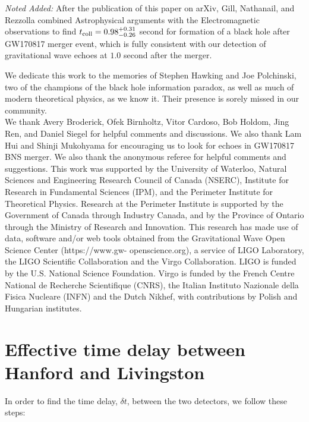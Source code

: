 \documentclass[a4paper,11pt]{article}
\begin{document}
{\it Noted Added:} After the publication of this paper on arXiv, Gill, Nathanail, and Rezzolla \cite{Gill:2019bvq} combined Astrophysical arguments with the Electromagnetic observations to find $t_{\rm coll}=0.98^{+0.31}_{-0.26}$ second for formation of a black hole after GW170817 merger event, which is fully consistent with our detection of gravitational wave echoes at $1.0$ second after the merger. 

\acknowledgments
We dedicate this work to the memories of Stephen Hawking and Joe Polchinski, two of the champions of the black hole information paradox, as well as much of  modern theoretical physics, as we know it. Their presence is sorely missed in our community. 
\\

We thank Avery Broderick,  Ofek Birnholtz, Vitor Cardoso, Bob Holdom, Jing Ren, and Daniel Siegel for helpful comments and discussions. We also thank Lam Hui and Shinji Mukohyama for encouraging us to look for echoes in GW170817 BNS merger. We also thank the anonymous referee for helpful comments and suggestions. This work was supported by the University of Waterloo, Natural Sciences and Engineering Research Council of Canada (NSERC), Institute for Research in Fundamental Sciences (IPM), and the Perimeter Institute for Theoretical Physics. Research at the Perimeter Institute is supported by the Government of Canada through Industry Canada, and by the Province of Ontario through the Ministry of Research and Innovation. This research has made use of data, software and/or web tools obtained from the Gravitational Wave Open Science Center (https://www.gw- openscience.org), a service of LIGO Laboratory, the LIGO Scientific Collaboration and the Virgo Collaboration. LIGO is funded by the U.S. National Science Foundation. Virgo is funded by the French Centre National de Recherche Scientifique (CNRS), the Italian Instituto Nazionale della Fisica Nucleare (INFN) and the Dutch Nikhef, with contributions by Polish and Hungarian institutes.




\appendix
\section{Effective time delay between Hanford and Livingston}\label{delta_t}
In order to find the time delay, $\delta t$, between the two detectors, we follow these steps:
\end{document}
